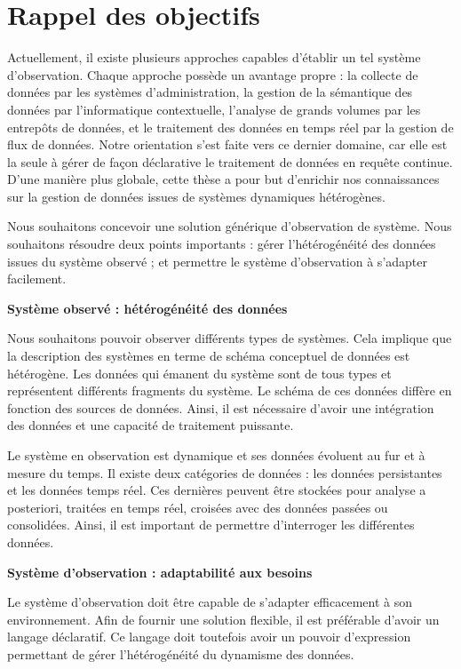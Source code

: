 \section{Rappel des objectifs}\label{sec:conclusion:objectifs}
Actuellement, il existe plusieurs approches capables d'établir un tel système d'observation. Chaque approche possède un avantage propre : la collecte de données par les systèmes d'administration, la gestion de la sémantique des données par l'informatique contextuelle, l'analyse de grands volumes par les entrepôts de données, et le traitement des données en temps réel par la gestion de flux de données. Notre orientation s'est faite vers ce dernier domaine, car elle est la seule à gérer de façon déclarative le traitement de données en requête continue. D'une manière plus globale, cette thèse a pour but d'enrichir nos connaissances sur la gestion de données issues de systèmes dynamiques hétérogènes.

Nous souhaitons concevoir une solution générique d'observation de système. Nous souhaitons résoudre deux points importants : gérer l'hétérogénéité des données issues du système observé ; et permettre le système d'observation à s'adapter facilement.

\vspace{1ex}\noindent\textbf{Système observé : hétérogénéité des données}

\vspace{1ex}
Nous souhaitons pouvoir observer différents types de systèmes. Cela implique que la description des systèmes en terme de schéma conceptuel de données est hétérogène. Les données qui émanent du système sont de tous types et représentent différents fragments du système. Le schéma de ces données diffère en fonction des sources de données. Ainsi, il est nécessaire d'avoir une intégration des données et une capacité de traitement puissante.

Le système en observation est dynamique et ses données évoluent au fur et à mesure du temps. Il existe deux catégories de données : les données persistantes et les données temps réel. Ces dernières peuvent être stockées pour analyse a posteriori, traitées en temps réel, croisées avec des données passées ou consolidées. Ainsi, il est important de permettre d'interroger les différentes données.

\vspace{1ex}\noindent\textbf{Système d'observation : adaptabilité aux besoins}

\vspace{1ex}
Le système d'observation doit être capable de s'adapter efficacement à son environnement. Afin de fournir une solution flexible, il est préférable d'avoir un langage déclaratif. Ce langage doit toutefois avoir un pouvoir d'expression permettant de gérer l'hétérogénéité du dynamisme des données.

